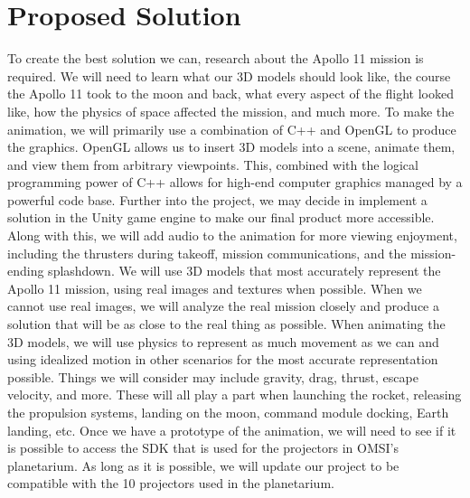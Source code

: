 \documentclass[onecolumn, draftclsnofoot,10pt, compsoc]{IEEEtran}
\begin{document}
\section{Proposed Solution}
To create the best solution we can, research about the Apollo 11 mission is required. We will need to learn what our 3D models should look like, the course the Apollo 11 took to the moon and back, what every aspect of the flight looked like, how the physics of space affected the mission, and much more. To make the animation, we will primarily use a combination of C++ and OpenGL to produce the graphics. OpenGL allows us to insert 3D models into a scene, animate them, and view them from arbitrary viewpoints. This, combined with the logical programming power of C++ allows for high-end computer graphics managed by a powerful code base. Further into the project, we may decide in implement a solution in the Unity game engine to make our final product more accessible. Along with this, we will add audio to the animation for more viewing enjoyment, including the thrusters during takeoff, mission communications, and the mission-ending splashdown.
\newline
\newline
We will use 3D models that most accurately represent the Apollo 11 mission, using real images and textures when possible. When we cannot use real images, we will analyze the real mission closely and produce a solution that will be as close to the real thing as possible. When animating the 3D models, we will use physics to represent as much movement as we can and using idealized motion in other scenarios for the most accurate representation possible. Things we will consider may include gravity, drag, thrust, escape velocity, and more. These will all play a part when launching the rocket, releasing the propulsion systems, landing on the moon, command module docking, Earth landing, etc. Once we have a prototype of the animation, we will need to see if it is possible to access the SDK that is used for the projectors in OMSI's planetarium. As long as it is possible, we will update our project to be compatible with the 10 projectors used in the planetarium. 
\end{document}
